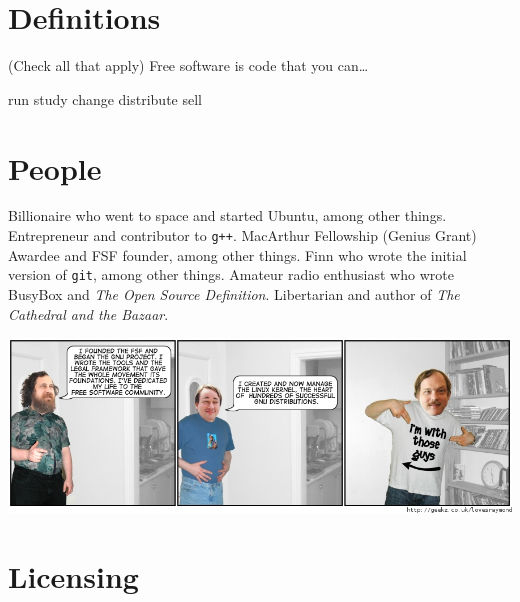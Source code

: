 \documentclass[addpoints]{exam}
\begin{document}
\begin{questions}

\section{Definitions}

\question (Check all that apply) Free software is code that you can\ldots

\begin{oneparcheckboxes}
\choice run
\choice study
\choice change
\choice distribute
\choice sell
\end{oneparcheckboxes}

\section{People}

\question Billionaire who went to space and started Ubuntu, among other things. \answerline[D]
\question Entrepreneur and contributor to \verb$g++$. \answerline[E]
\question MacArthur Fellowship (Genius Grant) Awardee and FSF founder, among other things. \answerline[F]
\question Finn who wrote the initial version of \verb$git$, among other things. \answerline[C]
\question Amateur radio enthusiast who wrote BusyBox and \emph{The Open Source Definition}. \answerline[A]
\question Libertarian and author of \emph{The Cathedral and the Bazaar}. \answerline[B]
\pagebreak

\includegraphics[width=5.5in]{people.jpg}

\section{Licensing}


\end{questions}
\end{document}
